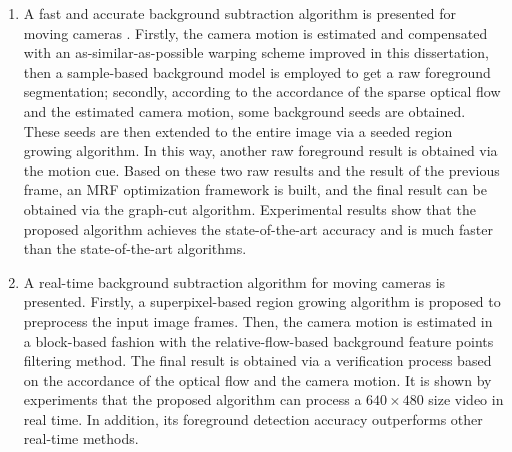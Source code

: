 \begin{eabstract}
\begin{enumerate}
   \item A fast and accurate background subtraction algorithm is presented for moving cameras . Firstly, the camera motion is estimated and compensated with an as-similar-as-possible warping scheme improved in this dissertation, then a sample-based background model is employed to get a raw foreground segmentation; secondly, according to the accordance of the sparse optical flow and the estimated camera motion, some background seeds are obtained. These seeds are then extended to the entire image via a seeded region growing algorithm. In this way, another raw foreground result is obtained via the motion cue. Based on these two raw results and the result of the previous frame, an MRF optimization framework is built, and the final result can be obtained via the graph-cut algorithm. Experimental results show that the proposed algorithm achieves the state-of-the-art accuracy and is much faster than the state-of-the-art algorithms.

   \item A real-time background subtraction algorithm for moving cameras is presented. Firstly, a superpixel-based region growing algorithm is proposed to preprocess the input image frames. Then, the camera motion is estimated in a block-based fashion with the relative-flow-based background feature points filtering method. The final result is obtained via a verification process based on the accordance of the optical flow and the camera motion. It is shown by experiments that the proposed algorithm can process a $640 \times 480$ size video in real time. In addition, its foreground detection accuracy outperforms other real-time methods.
   \end{enumerate}

\end{eabstract}

